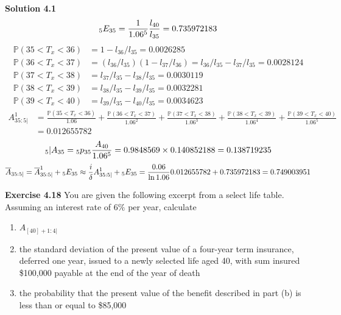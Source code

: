 \documentclass[hidelinks, 12pt]{article}
\theoremstyle{mydefstyle}
\theoremstyle{mythmstyle}
\begin{document}
\textbf{Solution 4.1}
\begin{gather*}
\hspace{0mm}_5E_{35} = \frac{1}{1.06^5} \frac{l_{40}}{l_{35}} = 0.735972183
\end{gather*}
\begin{align*}
\mathbb{P}(35 < T_x < 36) &= 1 - l_{36}/l_{35} = 0.0026285 \\
\mathbb{P}(36 < T_x < 37) &= (l_{36}/l_{35})(1- l_{37}/l_{36}) = l_{36}/l_{35} - l_{37}/l_{35} = 0.0028124 \\
\mathbb{P}(37 < T_x < 38) &=  l_{37}/l_{35} - l_{38}/l_{35} = 0.0030119 \\
\mathbb{P}(38 < T_x < 39) &=  l_{38}/l_{35} - l_{39}/l_{35} = 0.0032281 \\
\mathbb{P}(39 < T_x < 40) &=  l_{39}/l_{35} - l_{40}/l_{35} = 0.0034623
\end{align*}
\begin{align*}
A_{35:5|}^1 
&= \frac{\mathbb{P}(35 < T_x < 36)}{1.06} 
+ \frac{\mathbb{P}(36 < T_x < 37)}{1.06^2} 
+ \frac{\mathbb{P}(37 < T_x < 38)}{1.06^3} 
+ \frac{\mathbb{P}(38 < T_x < 39)}{1.06^4} 
+ \frac{\mathbb{P}(39 < T_x < 40)}{1.06^5} \\
&= 0.012655782
\end{align*}
\begin{gather*}
\hspace{0mm}_5\vert A_{35} = \hspace{0mm}_5p_{35} \frac{A_{40}}{1.06^5} = 0.9848569 \times 0.140852188 = 0.138719235
\end{gather*}
\begin{gather*}
\overline{A}_{35:5|}
= \overline{A}_{35:5|}^1 + \hspace{0mm}_5E_{35} 
\approx \frac{i}{\delta} A_{35:5|}^1 + \hspace{0mm}_5E_{35} 
= \frac{0.06}{\ln 1.06} 0.012655782 + 0.735972183
= 0.749003951
\end{gather*}

\textbf{Exercise 4.18} You are given the following excerpt from a select life table. Assuming an interest rate of $6\%$ per year, calculate
\begin{enumerate}[label=(\alph*)]
\item $A_{[40]+1:4|}$
\item the standard deviation of the present value of a four-year term insurance, deferred one year, issued to a newly selected life aged 40, with sum insured \$100,000 payable at the end of the year of death
\item \color{red}the probability that the present value of the benefit described in part (b) is less than or equal to \$85,000 \color{black}
\end{enumerate}
\end{document}

